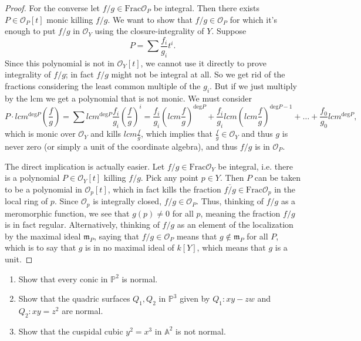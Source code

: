 \documentclass{book}
\begin{document}
\begin{proof}
For the converse
let $f/g \in \text{Frac}\mathcal{O}_P$
be integral.
Then there exists $P \in \mathcal{O}_P[t]$
monic killing $f/g$.
We want to show that $f/g \in \mathcal{O}_P$
for which it's enough to put $f/g$ in
$\mathcal{O}_Y$ using the closure-integrality
of $Y$.
Suppose
$$
P=\sum \frac{f_i}{g_i}t^i.
$$
Since this polynomial is not in
$\mathcal{O}_Y[t]$, we cannot use it directly
to prove integrality of $f/g$;
in fact $f/g$ might not be integral at all.
So we get rid of the fractions
considering the least common multiple
of the $g_i$.
But if we just multiply by the lcm
we get a polynomial that is not monic.
We must consider
$$
P\cdot lcm^{\text{deg}P}
\left(\frac{f}{g}\right)
=\sum lcm^{\text{deg}P}\frac{f_i}{g_i}
\left(\frac{f}{g}\right)^i
=\frac{f_i}{g_i}
\left(lcm \frac{f}{g}\right)^{\text{deg}P}
+\frac{f_i}{g_i}lcm
\left(lcm\frac{f}{g}\right)^{\text{deg}P-1}
+…
+\frac{f_0}{g_0}lcm^{\text{deg}P},
$$
which is monic over $\mathcal{O}_Y$
and kills $lcm \frac{f}{g}$,
which implies that $\frac{f}{g}
\in \mathcal{O}_Y$
and thus $g$ is never zero
(or simply a unit of the coordinate algebra),
and thus $f/g$ is in $\mathcal{O}_P$.

The direct implication is actually easier.
Let $f/g \in \text{Frac}\mathcal{O}_Y$
be integral, i.e. there is a polynomial
$P \in \mathcal{O}_Y[t]$ killing $f/g$.
Pick any point $p \in Y$.
Then $P$ can be taken to be a polynomial
in $\mathcal{O}_p[t]$, which in fact
kills the fraction
$\overline{f/g} \in \text{Frac}\mathcal{O}_p$
in the local ring of $p$.
Since $\mathcal{O}_p$ is integrally closed,
$f/g \in \mathcal{O}_P$.
Thus, thinking of $f/g$ as a meromorphic
function, we see that $g(p) \neq  0$ for all $p$,
meaning the fraction $f/g$ is in fact
regular. Alternatively, thinking of $f/g$
as an element of the localization by the
maximal ideal $\mathfrak{m}_P$,
saying that $f/g \in \mathcal{O}_P$
means that $g \not\in \mathfrak{m}_P$
for all $P$, which is to say that $g$
is in no maximal ideal of $k[Y]$,
which means that $g$ is a unit.
\end{proof}

\begin{exercise}
\label{exercise-normal-varieties-examples}
\begin{enumerate}
\item Show that every conic in $\mathbb{P}^2$
is normal.
\item Show that the quadric surfaces
$Q_1,Q_2$ in $\mathbb{P}^3$ given by
$Q_1:xy-zw$ and $Q_2:xy=z^2$ are normal.
\item Show that the cuspidal cubic
$y^2=x^3$ in $\mathbb{A}^2$
is not normal.
\end{enumerate}
\end{exercise}
\end{document}
